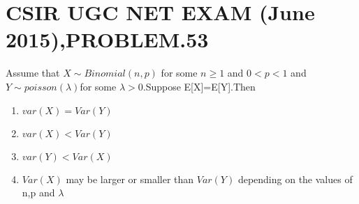 \documentclass[journal,12pt,twocolumn]{IEEEtran}
\begin{document}
\section{CSIR UGC NET EXAM (June 2015),PROBLEM.53}
Assume that $X\sim Binomial(n, p)$ for some $n\geq 1$ and $0<p<1$
and $Y\sim poisson(\lambda)$for some $\lambda > 0$.Suppose E[X]=E[Y].Then
\begin{enumerate}
    \item $var(X)=Var(Y)$\\
    \item $var(X)<Var(Y)$\\
    \item $var(Y)<Var(X)$\\
    \item $Var(X)$ may be larger or smaller than $Var(Y)$ depending on the values of n,p and $\lambda$
\end{enumerate}
\end{document}
